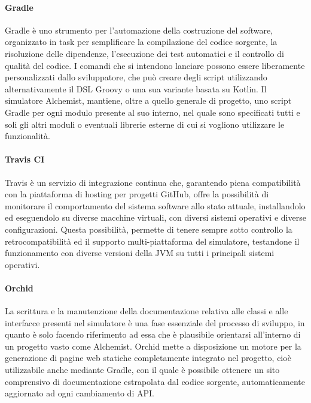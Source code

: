 \paragraph{Gradle}
Gradle è uno strumento per l'automazione della costruzione del software, organizzato in task per semplificare la compilazione del codice sorgente, la risoluzione delle dipendenze, l'esecuzione dei test automatici e il controllo di qualità del codice. I comandi che si intendono lanciare possono essere liberamente personalizzati dallo sviluppatore, che può creare degli script utilizzando alternativamente il DSL Groovy o una sua variante basata su Kotlin. \newline
Il simulatore Alchemist, mantiene, oltre a quello generale di progetto, uno script Gradle per ogni modulo presente al suo interno, nel quale sono specificati tutti e soli gli altri moduli o eventuali librerie esterne di cui si vogliono utilizzare le funzionalità.

\paragraph{Travis CI}
Travis è un servizio di integrazione continua che, garantendo piena compatibilità con la piattaforma di hosting per progetti GitHub, offre la possibilità di monitorare il comportamento del sistema software allo stato attuale, installandolo ed eseguendolo su diverse macchine virtuali, con diversi sistemi operativi e diverse configurazioni. \newline
Questa possibilità, permette di tenere sempre sotto controllo la retrocompatibilità ed il supporto multi-piattaforma del simulatore, testandone il funzionamento con diverse versioni della JVM su tutti i principali sistemi operativi.

\paragraph{Orchid}
La scrittura e la manutenzione della documentazione relativa alle classi e alle interfacce presenti nel simulatore è una fase essenziale del processo di sviluppo, in quanto è solo facendo riferimento ad essa che è plausibile orientarsi all'interno di un progetto vasto come Alchemist. \newline
Orchid mette a disposizione un motore per la generazione di pagine web statiche completamente integrato nel progetto, cioè utilizzabile anche mediante Gradle, con il quale è possibile ottenere un sito comprensivo di documentazione estrapolata dal codice sorgente, automaticamente aggiornato ad ogni cambiamento di API.

